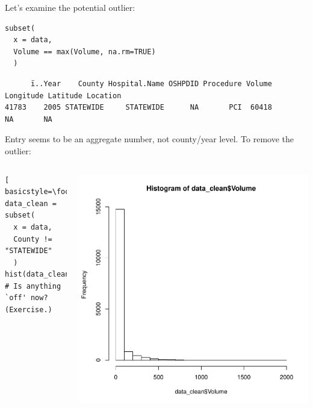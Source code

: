 \begin{frame}
Let's examine the potential outlier:
  \begin{lstlisting}
subset(
  x = data, 
  Volume == max(Volume, na.rm=TRUE)
  )
  \end{lstlisting}
{ \tiny
\begin{verbatim}
      ï..Year    County Hospital.Name OSHPDID Procedure Volume Longitude Latitude Location
41783    2005 STATEWIDE     STATEWIDE      NA       PCI  60418        NA       NA         
\end{verbatim}
}

\newpage

Entry seems to be an aggregate number, not county/year level.  To remove the outlier:

    \begin{columns}
  \begin{lstlisting}[ basicstyle=\footnotesize]
data_clean = subset(
  x = data, 
  County != "STATEWIDE"
  )
hist(data_clean$Volume)
# Is anything `off' now? (Exercise.)
  \end{lstlisting}

    \begin{center}
       \includegraphics[scale=0.3]{images/histogram2.pdf}
    \end{center}   
\end{columns}

\end{frame}

